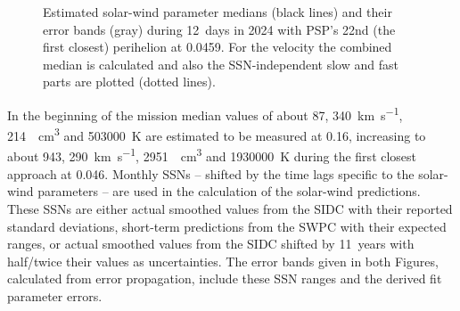 \documentclass[]{aa}
\begin{document}
        \begin{figure}
                \caption{Estimated solar-wind parameter medians (black lines) and their error bands (gray) during 12~days in 2024 with PSP's 22nd (the first closest) perihelion at \SI{0.0459}{\au}. For the velocity the combined median is calculated and also the SSN-independent slow and fast parts are plotted (dotted lines).}
                \label{fig:SPP_perihelia_prediction_nearest_f_plot}
        \end{figure}
        In the beginning of the mission median values of about \SI{87}{\nT}, \SI{340}{\km\per\s}, \SI{214}{\per\cm\cubed} and \SI{503000}{\K} are estimated to be measured at \SI{0.16}{\au}, increasing to about \SI{943}{\nT}, \SI{290}{\km\per\s}, \SI{2951}{\per\cm\cubed} and \SI{1930000}{\K} during the first closest approach at \SI{0.046}{\au}. Monthly SSNs -- shifted by the time lags specific to the solar-wind parameters -- are used in the calculation of the solar-wind predictions. These SSNs are either actual smoothed values from the SIDC with their reported standard deviations, short-term predictions from the SWPC with their expected ranges, or actual smoothed values from the SIDC shifted by 11~years with half/twice their values as uncertainties. The error bands given in both Figures, calculated from error propagation, include these SSN ranges and the derived fit parameter errors.
\end{document}
